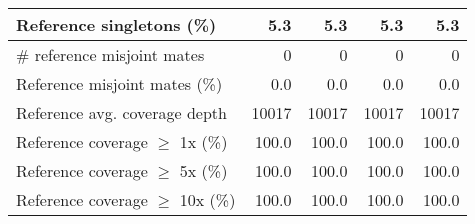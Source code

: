 \documentclass[12pt,a4paper]{article}
\begin{document}
\begin{table}[ht]
\begin{center}
\begin{tabular}{|l*{4}{|r}|}
Reference singletons (\%) & 5.3 & 5.3 & 5.3 & 5.3 \\ \hline
\# reference misjoint mates & 0 & 0 & 0 & 0 \\ \hline
Reference misjoint mates (\%) & 0.0 & 0.0 & 0.0 & 0.0 \\ \hline
Reference avg. coverage depth & 10017 & 10017 & 10017 & 10017 \\ \hline
Reference coverage $\geq$ 1x (\%) & 100.0 & 100.0 & 100.0 & 100.0 \\ \hline
Reference coverage $\geq$ 5x (\%) & 100.0 & 100.0 & 100.0 & 100.0 \\ \hline
Reference coverage $\geq$ 10x (\%) & 100.0 & 100.0 & 100.0 & 100.0 \\ \hline
\end{tabular}
\end{center}
\end{table}
\end{document}
